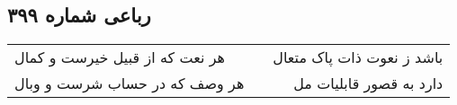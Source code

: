 \begin{center}
\section*{رباعی شماره ۳۹۹}
\label{sec:sh399}
\begin{longtable}{l p{0.5cm} r}
هر نعت که از قبیل خیرست و کمال
&&
باشد ز نعوت ذات پاک متعال
\\
هر وصف که در حساب شرست و وبال
&&
دارد به قصور قابلیات مل
\\
\end{longtable}
\end{center}

